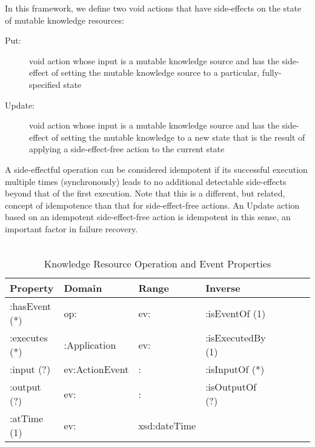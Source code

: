 \documentclass[runningheads]{llncs}
\begin{document}
In this framework, we define two void actions that have side-effects on the state of mutable knowledge resources:
  \begin{description}
    \item[Put:] void action whose input is a mutable knowledge source and has the side-effect of setting the mutable knowledge source to a particular, fully-specified state
    \item[Update:] void action whose input is a mutable knowledge source and has the side-effect of setting the mutable knowledge to a new state that is the result of applying a side-effect-free action to the current state
  \end{description}
  
  A side-effectful operation can be considered idempotent if its successful execution multiple times (synchronously) leads to no additional detectable side-effects beyond that of the first execution. Note that this is a different, but related, concept of idempotence than that for side-effect-free actions. An Update action based on an idempotent side-effect-free action is idempotent in this sense, an important factor in failure recovery.\\
\\
\begin{table}[h]
\begin{tabular}{|l|l|l|l|l|l|l|l|}
\hline
\textbf{Property}  &\textbf{Domain}  & \textbf{Range}  & \textbf{Inverse}
\\ \hline
:hasEvent (*)      & op:               & ev:             & :isEventOf  (1)         \\ \hline
:executes (*)      & :Application      & ev:             & :isExecutedBy  (1)         \\ \hline
:input (?)         & ev:ActionEvent    &    :          & :isInputOf  (*)         \\ \hline
:output (?)        & ev:               &    :          & :isOutputOf  (?)         \\ \hline
:atTime (1)        & ev:               &    xsd:dateTime          &          \\ \hline
\end{tabular}
\caption{Knowledge Resource Operation and Event Properties}
\label{kropprop}
\end{table}

\vspace{-0.8cm}
\end{document}
